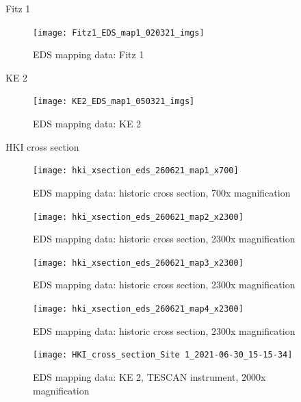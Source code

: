 Fitz 1

\begin{figure}[H]
\centering
  \texttt{[image: Fitz1\_EDS\_map1\_020321\_imgs]}
\caption[EDS mapping data: Fitz 1]{EDS mapping data: Fitz 1}
\label{fig:fitz1_map2}
\end{figure}

KE 2

\begin{figure}[H]
\centering
  \texttt{[image: KE2\_EDS\_map1\_050321\_imgs]}
\caption[EDS mapping data: KE 2]{EDS mapping data: KE 2}
\label{fig:ke2_map2}
\end{figure}

HKI cross section

\begin{figure}[H] %
\centering
  \texttt{[image: hki\_xsection\_eds\_260621\_map1\_x700]}
\caption[EDS mapping data: historic cross section, 700x magnification]{EDS mapping data: historic cross section, 700x magnification}
\label{fig:xsection_map3}
\end{figure}

\begin{figure}[H] %
\centering
  \texttt{[image: hki\_xsection\_eds\_260621\_map2\_x2300]}
\caption[EDS mapping data: historic cross section, 700x magnification]{EDS mapping data: historic cross section, 2300x magnification}
\label{fig:xsection_map4}
\end{figure}

\begin{figure}[H] %
\centering
  \texttt{[image: hki\_xsection\_eds\_260621\_map3\_x2300]}
\caption[EDS mapping data: historic cross section, 2300x magnification]{EDS mapping data: historic cross section, 2300x magnification}
\label{fig:xsection_map5}
\end{figure}

\begin{figure}[H] %
\centering
  \texttt{[image: hki\_xsection\_eds\_260621\_map4\_x2300]}
\caption[EDS mapping data: historic cross section, 2300x magnification]{EDS mapping data: historic cross section, 2300x magnification}
\label{fig:xsection_map6}
\end{figure}


\begin{figure}[H] %
\centering
  \texttt{[image: HKI\_cross\_section\_Site 1\_2021-06-30\_15-15-34]}
\caption[EDS mapping data: KE 2, TESCAN instrument, 2000x magnification]{EDS mapping data: KE 2, TESCAN instrument, 2000x magnification}
\label{fig:xsection_map7}
\end{figure}


